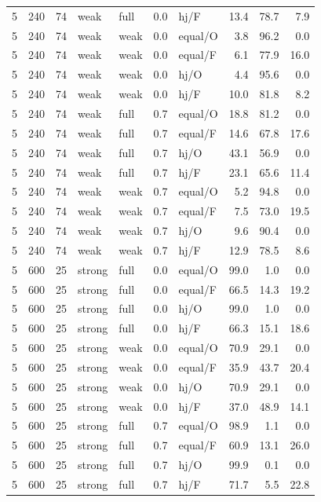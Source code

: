 {\begin{longtable}{@{}rrrllllrrr@{}}
5 & 240 & 74 & weak & full & 0.0 & hj/F & 13.4 & 78.7 & 7.9\\
5 & 240 & 74 & weak & weak & 0.0 & equal/O & 3.8 & 96.2 & 0.0\\
5 & 240 & 74 & weak & weak & 0.0 & equal/F & 6.1 & 77.9 & 16.0\\
5 & 240 & 74 & weak & weak & 0.0 & hj/O & 4.4 & 95.6 & 0.0\\
5 & 240 & 74 & weak & weak & 0.0 & hj/F & 10.0 & 81.8 & 8.2\\
5 & 240 & 74 & weak & full & 0.7 & equal/O & 18.8 & 81.2 & 0.0\\
5 & 240 & 74 & weak & full & 0.7 & equal/F & 14.6 & 67.8 & 17.6\\
5 & 240 & 74 & weak & full & 0.7 & hj/O & 43.1 & 56.9 & 0.0\\
5 & 240 & 74 & weak & full & 0.7 & hj/F & 23.1 & 65.6 & 11.4\\
5 & 240 & 74 & weak & weak & 0.7 & equal/O & 5.2 & 94.8 & 0.0\\
5 & 240 & 74 & weak & weak & 0.7 & equal/F & 7.5 & 73.0 & 19.5\\
5 & 240 & 74 & weak & weak & 0.7 & hj/O & 9.6 & 90.4 & 0.0\\
5 & 240 & 74 & weak & weak & 0.7 & hj/F & 12.9 & 78.5 & 8.6\\
5 & 600 & 25 & strong & full & 0.0 & equal/O & 99.0 & 1.0 & 0.0\\
5 & 600 & 25 & strong & full & 0.0 & equal/F & 66.5 & 14.3 & 19.2\\
5 & 600 & 25 & strong & full & 0.0 & hj/O & 99.0 & 1.0 & 0.0\\
5 & 600 & 25 & strong & full & 0.0 & hj/F & 66.3 & 15.1 & 18.6\\
5 & 600 & 25 & strong & weak & 0.0 & equal/O & 70.9 & 29.1 & 0.0\\
5 & 600 & 25 & strong & weak & 0.0 & equal/F & 35.9 & 43.7 & 20.4\\
5 & 600 & 25 & strong & weak & 0.0 & hj/O & 70.9 & 29.1 & 0.0\\
5 & 600 & 25 & strong & weak & 0.0 & hj/F & 37.0 & 48.9 & 14.1\\
5 & 600 & 25 & strong & full & 0.7 & equal/O & 98.9 & 1.1 & 0.0\\
5 & 600 & 25 & strong & full & 0.7 & equal/F & 60.9 & 13.1 & 26.0\\
5 & 600 & 25 & strong & full & 0.7 & hj/O & 99.9 & 0.1 & 0.0\\
5 & 600 & 25 & strong & full & 0.7 & hj/F & 71.7 & 5.5 & 22.8\\

\end{longtable}}
